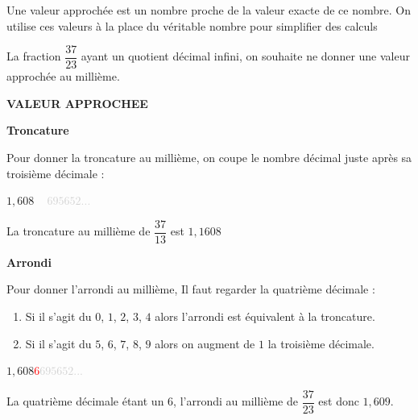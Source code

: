 \documentclass[a4paper,10pt]{report}
\begin{document}
\begin{defn}
Une valeur approchée est un nombre proche de la valeur exacte de ce nombre. On utilise ces valeurs à la place du véritable nombre pour simplifier des calculs
\end{defn}

\begin{ex}

\noindent\grandscarreaux{\linewidth}{4cm}
\end{ex}

\begin{meth}

La fraction \href{https://www.numworks.com/fr/simulateur/}{$\dfrac{37}{23}$} ayant un quotient décimal infini, on souhaite ne donner une valeur approchée au millième. 

\begin{center}
\textbf{VALEUR APPROCHEE}
\end{center}

\noindent \begin{minipage}{8cm}
\begin{center}
\textbf{Troncature}
\end{center}
Pour donner la troncature au millième, on coupe le nombre décimal juste après sa troisième décimale :

\vspace{0.9cm}
\begin{center}
\huge{$1,608$} \bcstop~ \textcolor{lightgray}{$695652...$}
\end{center}

\vspace{0.9cm}
La troncature au millième de $\dfrac{37}{13}$ est $1,1608$
\end{minipage}
\hspace{3mm}
\vline
\hspace{3mm}
\begin{minipage}{8cm}
\begin{center}
\textbf{Arrondi}
\end{center}
Pour donner l'arrondi au millième, Il faut regarder la quatrième décimale :

\begin{enumerate}
\item[•]Si il s'agit du $0$, $1$, $2$, $3$, $4$ alors l'arrondi est équivalent à la troncature.
\item[•]Si il s'agit du $5$, $6$, $7$, $8$, $9$ alors on augment de $1$ la troisième décimale.
\end{enumerate}
\begin{center}
\huge{$1,608$}\textcolor{red}{$6$}\textcolor{lightgray}{$695652...$}
\end{center}
La quatrième décimale étant un $6$, l'arrondi au millième de $\dfrac{37}{23}$ est donc $1,609$.
\end{minipage}
\end{meth}
\end{document}
